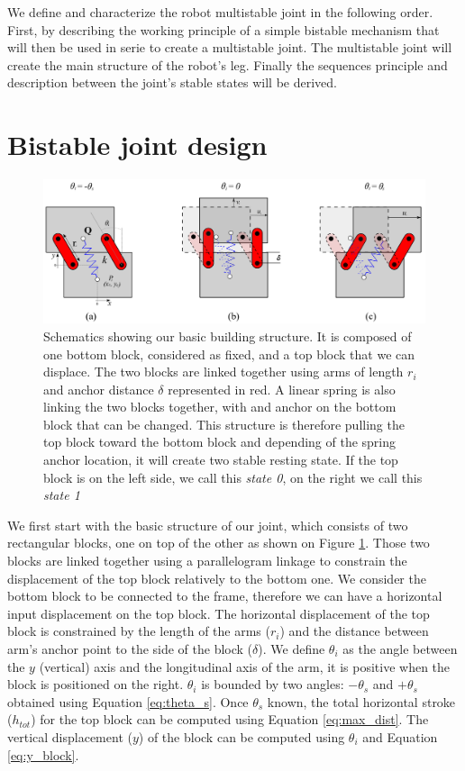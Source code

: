     We define and characterize the robot multistable joint in the following order. First, by describing the working principle of a simple bistable mechanism that will then be used in serie to create a multistable joint. The multistable joint will create the main structure of the robot's leg. Finally the sequences principle and description between the joint's stable states will be derived.

    \section{Bistable joint design}
    \label{sec:bistable}
    \begin{figure}
        \centering
        \includegraphics[width=1.0\textwidth]{images/basics_building_blocks.png}
        \caption{Schematics showing our basic building structure. It is composed of one bottom block, considered as fixed, and a top block that we can displace. The two blocks are linked together using arms of length $r_i$ and anchor distance $\delta$ represented in red. A linear spring is also linking the two blocks together, with and anchor on the bottom block that can be changed. This structure is therefore pulling the top block toward the bottom block and depending of the spring anchor location, it will create two stable resting state. If the top block is on the left side, we call this \textit{state 0}, on the right we call this \textit{state 1}}
        \label{fig:joint_basics}
    \end{figure}
    We first start with the basic structure of our joint, which consists of two rectangular blocks, one on top of the other as shown on Figure \ref{fig:joint_basics}. Those two blocks are linked together using a parallelogram linkage to constrain the displacement of the top block relatively to the bottom one. We consider the bottom block to be connected to the frame, therefore we can have a horizontal input displacement on the top block. The horizontal displacement of the top block is constrained by the length of the arms ($r_i$) and the distance between arm's anchor point to the side of the block ($\delta$). We define $\theta_i$ as the angle between the $y$ (vertical) axis and the longitudinal axis of the arm, it is positive when the block is positioned on the right. $\theta_i$ is bounded by two angles: $-\theta_s$ and $+\theta_s$ obtained using Equation \ref{eq:theta_s}. Once $\theta_s$ known, the total horizontal stroke ($h_{tot}$) for the top block can be computed using Equation \ref{eq:max_dist}. The vertical displacement ($y$) of the block can be computed using $\theta_i$ and Equation \ref{eq:y_block}.
    
